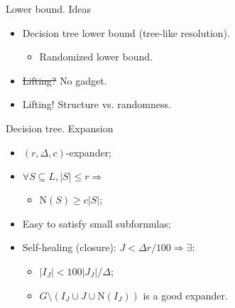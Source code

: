 \begin{frame}{Lower bound. Ideas}

    \begin{itemize}
        \item Decision tree lower bound (tree-like resolution).
            \pause
            \begin{itemize}
                \item \alert{Randomized} lower bound.
            \end{itemize}
            \pause
        \item {} \pause \sout{Lifting?} \alert{No gadget.}
            \pause
        \item Lifting! Structure vs. randomness.
    \end{itemize}
\end{frame}

\begin{frame}{Decision tree. Expansion}

    \begin{minipage}{0.38\linewidth}
        \centering
        
    \end{minipage}
    \begin{minipage}{0.58\linewidth}
        \begin{itemize}
            \item $(r, \Delta, c)$-expander;
            \item $\forall S \subseteq L, |S| \le r \Rightarrow$
                \begin{itemize}
                    \item $\mathrm{N}(S) \ge c |S|$;
                \end{itemize}
        \end{itemize}
    \end{minipage}

    \pause

    \vspace{1cm}
    \begin{itemize}
        \item Easy to satisfy small subformulas;
            \pause
        \item Self-healing (closure): $J < \Delta r / 100 \Rightarrow
            \exists \colon$
            \begin{itemize}
                \item $|I_J| < 100 |J_J| / \Delta$;
                \item $G \setminus (I_J \cup J \cup \mathrm{N}(I_J))$
                    is a good expander.
            \end{itemize}
    \end{itemize}

\end{frame}

